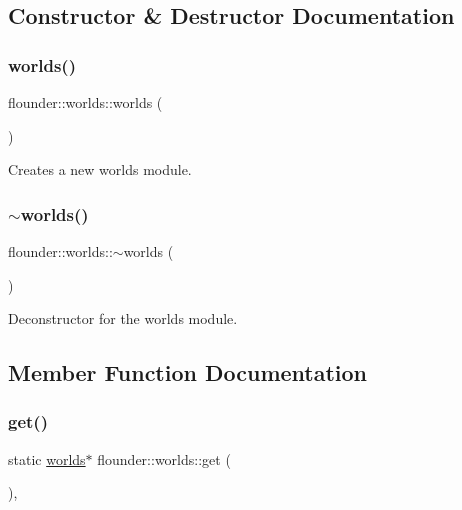 \subsection{Constructor \& Destructor Documentation}
\mbox{\label{classflounder_1_1worlds_af62d72f1ecead18a054ad8b8933a87eb}} 
\subsubsection{\texorpdfstring{worlds()}{worlds()}}
{\footnotesize\ttfamily flounder\+::worlds\+::worlds (\begin{DoxyParamCaption}{ }\end{DoxyParamCaption})}



Creates a new worlds module. 

\mbox{\label{classflounder_1_1worlds_aec7eb730e473ffecbbd4d722b1d34a5b}} 
\subsubsection{\texorpdfstring{$\sim$worlds()}{~worlds()}}
{\footnotesize\ttfamily flounder\+::worlds\+::$\sim$worlds (\begin{DoxyParamCaption}{ }\end{DoxyParamCaption})}



Deconstructor for the worlds module. 



\subsection{Member Function Documentation}
\mbox{\label{classflounder_1_1worlds_a4e2369a32659c1ee0dbc62ef481f3a89}} 
\subsubsection{\texorpdfstring{get()}{get()}}
{\footnotesize\ttfamily static \hyperlink{classflounder_1_1worlds}{worlds}$\ast$ flounder\+::worlds\+::get (\begin{DoxyParamCaption}{ }\end{DoxyParamCaption})\hspace{0.3cm}{\ttfamily [inline]}, {\ttfamily [static]}}



